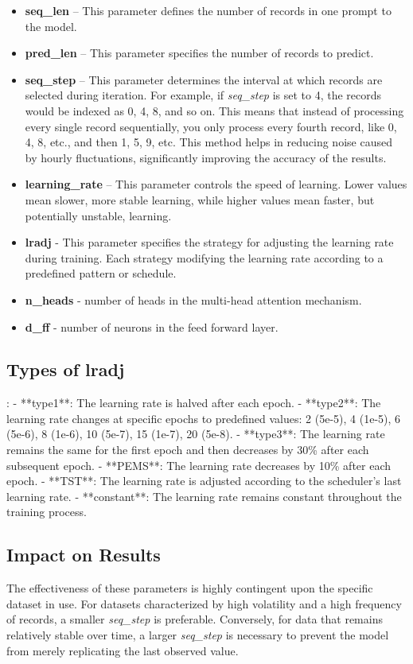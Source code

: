 \begin{itemize}
	\item \textbf{seq\_len} – This parameter defines the number of records in one prompt to the model.
	\item \textbf{pred\_len} – This parameter specifies the number of records to predict.
	\item \textbf{seq\_step} – This parameter determines the interval at which records are selected during iteration. For example, if \textit{seq\_step} is set to 4, the records would be indexed as 0, 4, 8, and so on. This means that instead of processing every single record sequentially, you only process every fourth record, like 0, 4, 8, etc., and then 1, 5, 9, etc. This method helps in reducing noise caused by hourly fluctuations, significantly improving the accuracy of the results.
	\item \textbf{learning\_rate} – This parameter controls the speed of learning. Lower values mean slower, more stable learning, while higher values mean faster, but potentially unstable, learning.
	\item \textbf{lradj} - This parameter specifies the strategy for adjusting the learning rate during training. Each strategy modifying the learning rate according to a predefined pattern or schedule.
	\item \textbf{n\_heads} - number of heads in the multi-head attention mechanism.
	\item \textbf{d\_ff} - number of neurons in the feed forward layer.
\end{itemize}

\subsection{Types of \textbf{lradj}}:
- **type1**: The learning rate is halved after each epoch.
- **type2**: The learning rate changes at specific epochs to predefined values: 2 (5e-5), 4 (1e-5), 6 (5e-6), 8 (1e-6), 10 (5e-7), 15 (1e-7), 20 (5e-8).
- **type3**: The learning rate remains the same for the first epoch and then decreases by 30\% after each subsequent epoch.
- **PEMS**: The learning rate decreases by 10\% after each epoch.
- **TST**: The learning rate is adjusted according to the scheduler’s last learning rate.
- **constant**: The learning rate remains constant throughout the training process.

\subsection{Impact on Results}
The effectiveness of these parameters is highly contingent upon the specific dataset in use. For datasets characterized by high volatility and a high frequency of records, a smaller \textit{seq\_step} is preferable. Conversely, for data that remains relatively stable over time, a larger \textit{seq\_step} is necessary to prevent the model from merely replicating the last observed value.

